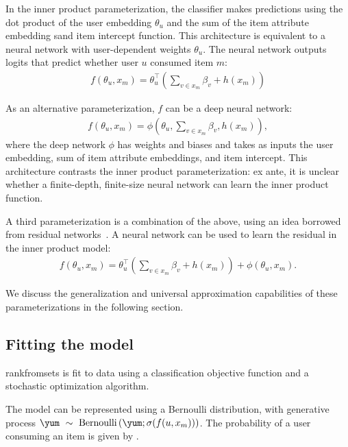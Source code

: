 In the inner product parameterization, the classifier makes predictions using
the dot product of the user embedding $\theta_u$ and the sum of the item
attribute embedding sand item intercept function.  This architecture is equivalent to
a neural network with user-dependent weights $\theta_u$. The neural network
outputs logits that predict whether user $u$ consumed item $m$:
\begin{align}
  f\left(\theta_u, x_m\right) = \theta_u^\top\left(\sum_{v\in x_{m}}
  \beta_v + h(x_m)\right)
  \label{eq:inner-product}
\end{align}

As an alternative parameterization, $f$ can be a deep neural network:
\begin{align}
  f(\theta_u, x_m) = \phi\left(\theta_u, \sum_{v\in x_m}
  \beta_v, h(x_m)\right),
  \label{eq:neural-network}
\end{align}
where the deep network $\phi$ has weights and biases and takes as inputs the
user embedding, sum of item attribute embeddings, and item intercept. This
architecture contrasts the inner product parameterization: ex ante, it is
unclear whether a finite-depth, finite-size neural network can learn the inner
product function.

A third parameterization is a combination of the above, using an idea borrowed
from residual networks~\citep{DBLP:journals/corr/HeZRS15}. A neural network can
be used to learn the residual in the inner product model:
\begin{align}
  f\left(\theta_u, x_m\right) = \theta_u^\top\left(\sum_{v\in x_m}
  \beta_v + h(x_m)\right) + \phi(\theta_u, x_m).
  \label{eq:residual}
\end{align}

We discuss the generalization and universal approximation capabilities of these
parameterizations in the following section.

\subsection{Fitting the model}
\label{sec:fitting}
\acrshort{rankfromsets} is fit to data using a classification objective function
and a stochastic optimization algorithm.

The model can be represented using a Bernoulli distribution, with generative
process $\yum~\sim~\textrm{Bernoulli}\left(\yum; \sigma(f(u, x_m))\right)$. The
probability of a user consuming an item is given by .

